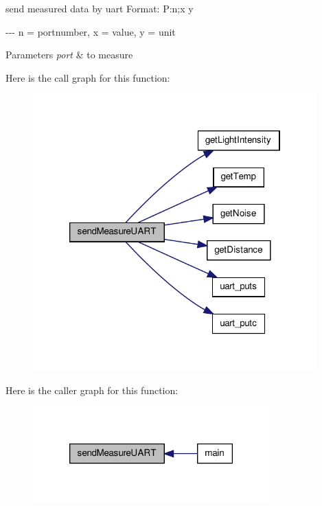 send measured data by uart \-Format\-: \-P\-:n;x y \par
 -\/-\/-\/ n = portnumber, x = value, y = unit 


\begin{DoxyParams}{\-Parameters}
{\em port} & to measure \\
\hline
\end{DoxyParams}


\-Here is the call graph for this function\-:\nopagebreak
\begin{figure}[H]
\begin{center}
\leavevmode
\includegraphics[width=310pt]{group__main_gad779a6805e18bdf90cf6b30e1bc8fd77_cgraph}
\end{center}
\end{figure}




\-Here is the caller graph for this function\-:\nopagebreak
\begin{figure}[H]
\begin{center}
\leavevmode
\includegraphics[width=258pt]{group__main_gad779a6805e18bdf90cf6b30e1bc8fd77_icgraph}
\end{center}
\end{figure}


